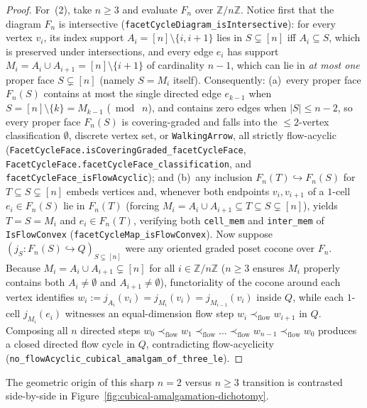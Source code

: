 \documentclass[10pt,twoside,openright]{book}
\theoremstyle{crmplain}
\theoremstyle{crmdef}
\theoremstyle{crmremark}
\begin{document}
\begin{proof}
For~(2), take $n \ge 3$ and evaluate $F_n$ over $\mathbb{Z}/n\mathbb{Z}$. Notice first that the diagram $F_n$ is intersective (\texttt{facetCycleDiagram\_\allowbreak isIntersective}): for every vertex $v_i$, its index support $A_i = [n] \setminus \{i, i+1\}$ lies in $S \subsetneq [n]$ iff $A_i \subseteq S$, which is preserved under intersections, and every edge $e_i$ has support $M_i = A_i \cup A_{i+1} = [n] \setminus \{i+1\}$ of cardinality $n - 1$, which can lie in \emph{at most one} proper face $S \subsetneq [n]$ (namely $S = M_i$ itself). Consequently: (a)~every proper face $F_n(S)$ contains at most the single directed edge $e_{k-1}$ when $S = [n] \setminus \{k\} = M_{k-1}$ ($\bmod\; n$), and contains zero edges when $|S| \le n - 2$, so every proper face $F_n(S)$ is covering-graded and falls into the $\le 2$-vertex classification $\emptyset$, discrete vertex set, or \texttt{WalkingArrow}, all strictly flow-acyclic (\texttt{FacetCycleFace.\allowbreak isCoveringGraded\_\allowbreak facetCycleFace}, \texttt{FacetCycleFace.\allowbreak facetCycleFace\_\allowbreak classification}, and \texttt{facetCycleFace\_\allowbreak isFlowAcyclic}); and (b)~any inclusion $F_n(T) \hookrightarrow F_n(S)$ for $T \subseteq S \subsetneq [n]$ embeds vertices and, whenever both endpoints $v_i, v_{i+1}$ of a $1$-cell $e_i \in F_n(S)$ lie in $F_n(T)$ (forcing $M_i = A_i \cup A_{i+1} \subseteq T \subseteq S \subsetneq [n]$), yields $T = S = M_i$ and $e_i \in F_n(T)$, verifying both \texttt{cell\_mem} and \texttt{inter\_mem} of \texttt{IsFlowConvex} (\texttt{facetCycleMap\_\allowbreak isFlowConvex}). Now suppose $(j_S : F_n(S) \hookrightarrow Q)_{S \subsetneq [n]}$ were any oriented graded poset cocone over $F_n$. Because $M_i = A_i \cup A_{i+1} \subsetneq [n]$ for all $i \in \mathbb{Z}/n\mathbb{Z}$ ($n \ge 3$ ensures $M_i$ properly contains both $A_i \neq \emptyset$ and $A_{i+1} \neq \emptyset$), functoriality of the cocone around each vertex identifies $w_i := j_{A_i}(v_i) = j_{M_i}(v_i) = j_{M_{i-1}}(v_i)$ inside $Q$, while each $1$-cell $j_{M_i}(e_i)$ witnesses an equal-dimension flow step $w_i \prec_{\mathrm{flow}} w_{i+1}$ in $Q$. Composing all $n$ directed steps $w_0 \prec_{\mathrm{flow}} w_1 \prec_{\mathrm{flow}} \dots \prec_{\mathrm{flow}} w_{n-1} \prec_{\mathrm{flow}} w_0$ produces a closed directed flow cycle in $Q$, contradicting flow-acyclicity (\texttt{no\_\allowbreak flowAcyclic\_\allowbreak cubical\_\allowbreak amalgam\_\allowbreak of\_\allowbreak three\_\allowbreak le}).
\end{proof}

The geometric origin of this sharp $n = 2$ versus $n \ge 3$ transition is contrasted side-by-side in Figure~\ref{fig:cubical-amalgamation-dichotomy}.
\end{document}
